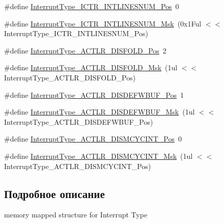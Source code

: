 \begin{DoxyCompactItemize}
\item 
\#define \mbox{\hyperlink{group___c_m_s_i_s___c_m3___interrupt_type_ga5d164b3cb981bd85afd35892d180a5c3}{Interrupt\+Type\+\_\+\+I\+C\+T\+R\+\_\+\+I\+N\+T\+L\+I\+N\+E\+S\+N\+U\+M\+\_\+\+Pos}}~0
\item 
\#define \mbox{\hyperlink{group___c_m_s_i_s___c_m3___interrupt_type_ga0a2c325cefdab97bd8ce3336a66a803e}{Interrupt\+Type\+\_\+\+I\+C\+T\+R\+\_\+\+I\+N\+T\+L\+I\+N\+E\+S\+N\+U\+M\+\_\+\+Msk}}~(0x1\+Ful $<$$<$ Interrupt\+Type\+\_\+\+I\+C\+T\+R\+\_\+\+I\+N\+T\+L\+I\+N\+E\+S\+N\+U\+M\+\_\+\+Pos)
\item 
\#define \mbox{\hyperlink{group___c_m_s_i_s___c_m3___interrupt_type_gaaa37f212111e6dbc9505d46b8bf8fa3e}{Interrupt\+Type\+\_\+\+A\+C\+T\+L\+R\+\_\+\+D\+I\+S\+F\+O\+L\+D\+\_\+\+Pos}}~2
\item 
\#define \mbox{\hyperlink{group___c_m_s_i_s___c_m3___interrupt_type_gac4d872ecfcf7dcb93f98824ada52a527}{Interrupt\+Type\+\_\+\+A\+C\+T\+L\+R\+\_\+\+D\+I\+S\+F\+O\+L\+D\+\_\+\+Msk}}~(1ul $<$$<$ Interrupt\+Type\+\_\+\+A\+C\+T\+L\+R\+\_\+\+D\+I\+S\+F\+O\+L\+D\+\_\+\+Pos)
\item 
\#define \mbox{\hyperlink{group___c_m_s_i_s___c_m3___interrupt_type_ga46fed31841c33811db8b3a9cbae6347b}{Interrupt\+Type\+\_\+\+A\+C\+T\+L\+R\+\_\+\+D\+I\+S\+D\+E\+F\+W\+B\+U\+F\+\_\+\+Pos}}~1
\item 
\#define \mbox{\hyperlink{group___c_m_s_i_s___c_m3___interrupt_type_ga3cecf9e9d75112aed3ed055343cbe23f}{Interrupt\+Type\+\_\+\+A\+C\+T\+L\+R\+\_\+\+D\+I\+S\+D\+E\+F\+W\+B\+U\+F\+\_\+\+Msk}}~(1ul $<$$<$ Interrupt\+Type\+\_\+\+A\+C\+T\+L\+R\+\_\+\+D\+I\+S\+D\+E\+F\+W\+B\+U\+F\+\_\+\+Pos)
\item 
\#define \mbox{\hyperlink{group___c_m_s_i_s___c_m3___interrupt_type_ga101a93632e4480073299b775bc5cbf12}{Interrupt\+Type\+\_\+\+A\+C\+T\+L\+R\+\_\+\+D\+I\+S\+M\+C\+Y\+C\+I\+N\+T\+\_\+\+Pos}}~0
\item 
\#define \mbox{\hyperlink{group___c_m_s_i_s___c_m3___interrupt_type_ga0c020eb28544979bfac2e219ed53c999}{Interrupt\+Type\+\_\+\+A\+C\+T\+L\+R\+\_\+\+D\+I\+S\+M\+C\+Y\+C\+I\+N\+T\+\_\+\+Msk}}~(1ul $<$$<$ Interrupt\+Type\+\_\+\+A\+C\+T\+L\+R\+\_\+\+D\+I\+S\+M\+C\+Y\+C\+I\+N\+T\+\_\+\+Pos)
\end{DoxyCompactItemize}


\subsection{Подробное описание}
memory mapped structure for Interrupt Type 

